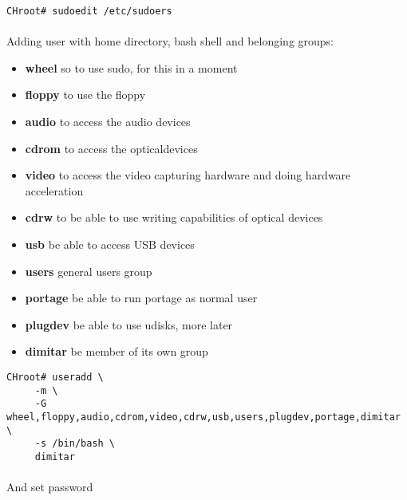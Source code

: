\documentclass[10pt,a4paper]{article}
\begin{document}
                    \begin{lstlisting}[style=BashInputCHRoot]
 CHroot# sudoedit /etc/sudoers
                    \end{lstlisting}



                    \paragraph{} Adding user with home directory, bash shell and belonging groups:

                    \begin{itemize}
                        \item \textbf{wheel} so to use sudo, for this in a moment
                        \item \textbf{floppy} to use the floppy
                        \item \textbf{audio} to access the audio devices
                        \item \textbf{cdrom} to access the opticaldevices
                        \item \textbf{video} to access the video capturing hardware and doing hardware acceleration
                        \item \textbf{cdrw} to be able to use writing capabilities of optical devices
                        \item \textbf{usb} be able to access USB devices
                        \item \textbf{users} general users group
                        \item \textbf{portage} be able to run portage as normal user
                        \item \textbf{plugdev} be able to use udisks, more later
                        \item \textbf{dimitar} be member of its own group
                    \end{itemize}

                    \begin{lstlisting}[style=BashInputCHRoot]
 CHroot# useradd \
     -m \
     -G wheel,floppy,audio,cdrom,video,cdrw,usb,users,plugdev,portage,dimitar \
     -s /bin/bash \
     dimitar
                    \end{lstlisting}

                    \paragraph{} And set password
\end{document}
